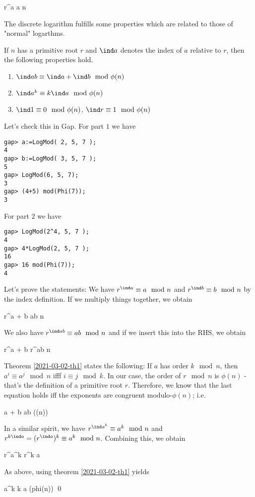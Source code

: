 \bee
r^{\ind a} \equiv a \mod n
\eee

The discrete logarithm fulfills some properties which are related to those of "normal" logarthms.

\begin{theorem}
  If $n$ has a primitive root $r$ and $\ind a $ denotes the index of $a$ relative to $r$, then the following properties hold.

  \begin{enumerate}
    \item $\ind ab \equiv \ind a + \ind b \mod \phi(n)$
    \item $\ind a^k \equiv k \ind a \mod \phi(n)$
    \item $\ind 1 \equiv 0 \mod \phi(n)$, $\ind r \equiv 1 \mod \phi(n)$
  \end{enumerate}

\end{theorem}

Let's check this in Gap. For part $1$ we have

\begin{verbatim}
gap> a:=LogMod( 2, 5, 7 );
4
gap> b:=LogMod( 3, 5, 7 );
5
gap> LogMod(6, 5, 7);
3
gap> (4+5) mod(Phi(7));
3
\end{verbatim}

For part $2$ we have

\begin{verbatim}
gap> LogMod(2^4, 5, 7 );
4
gap> 4*LogMod(2, 5, 7 );
16
gap> 16 mod(Phi(7));
4
\end{verbatim}

Let's prove the statements: We have $r^{\ind a} \equiv a \mod n$ and $r^{\ind b} \equiv b \mod n$ by the index definition. If we multiply things together, we obtain

\bee
r^{\ind a + \ind b} \equiv ab \mod n
\eee

We also have $r^{\ind ab} \equiv ab \mod n$ and if we insert this into the RHS, we obtain

\bee
r^{\ind a + \ind b} \equiv r^{\ind ab} \mod n
\eee


Theorem \ref{2021-03-02-th1} states the following: If $a$ has order $k \mod n$, then $a^i \equiv a^j \mod n$ ifff $i \equiv j \mod k$. In our case, the order of $r \mod n$ is $\phi(n)$ - that's the definition of a primitive root $r$. Therefore, we know that the last equation holds iff the exponents are congruent modulo-$\phi(n)$; i.e.

\bee
\ind a + \ind b \equiv \ind ab \mod(\phi(n))
\eee

In a similar spirit, we have $r^{\ind a^k} \equiv a^k \mod n$ and $r^{k \ind a} = (r^{\ind a})^k \equiv a^k \mod n$. Combining this, we obtain

\bee
r^{\ind a^k} \equiv r^{k \ind a}
\eee

As above, using theorem \ref{2021-03-02-th1} yields

\bee
\ind a^k \equiv k \ind a \mod(phi(n)) \qed
\eee

